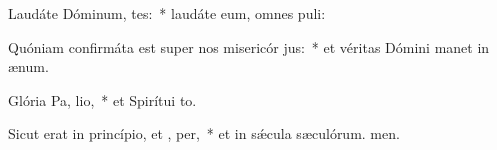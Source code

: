 \item Laudáte Dóminum,  tes:~* laudáte eum, omnes puli:
\item Quóniam confirmáta est super nos misericór jus:~* et véritas Dómini manet in ænum.
\item Glória Pa,  lio,~* et Spirítui to.
\item Sicut erat in princípio, et ,  per,~* et in sǽcula sæculórum. men.
